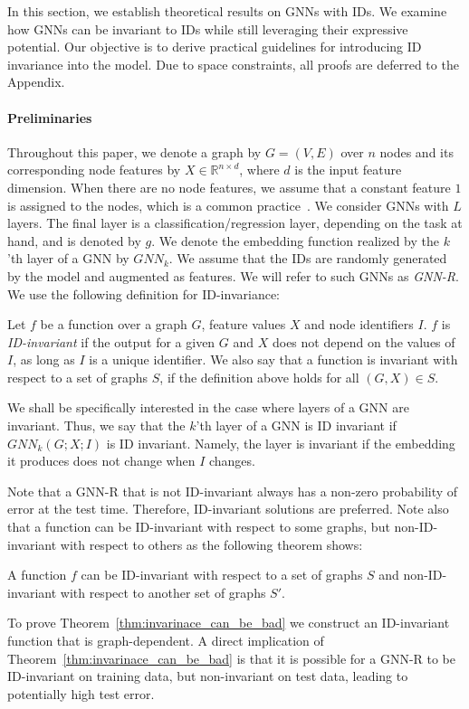 

In this section, we establish theoretical results on GNNs with IDs. We examine how  GNNs can be invariant to IDs while still leveraging their expressive potential.
Our objective is to derive practical guidelines for introducing ID invariance into the model. Due to space constraints, all proofs are deferred to the Appendix.

\paragraph{Preliminaries} Throughout this paper, we denote a graph by $G = (V, E)$ over $n$ nodes and its corresponding node features by ${X} \in \mathbb{R}^{n\times d}$, where \( d \) is the input feature dimension.
When there are no node features, we assume that a constant feature $1$ is assigned to the nodes, which is a common practice~\citep{gin, morris2021weisfeiler}.
We consider GNNs with \( L \) layers. The final layer is a classification/regression layer, depending on the task at hand, and is denoted by $g$.
We denote the embedding function realized by the $k$'th layer of a GNN by $GNN_k$.
We assume that the IDs are randomly generated by the model and augmented as features. We will refer to such GNNs as \textit{GNN-R}.
We use the following definition for ID-invariance:
\begin{definition}
    Let $f$ be a function over a graph $G$, feature values $X$ and node identifiers $I$.  $f$ is \textit{ID-invariant} if  the output for a given $G$ and $X$ does not depend on the values of $I$, as long as $I$ is a unique identifier. We also say that a function is invariant with respect to a set of graphs $S$, if the definition above holds for all $(G,X)\in S$.
\end{definition}


We shall be specifically interested in the case where layers of a GNN are invariant. Thus, we say that the $k$'th layer of a GNN is ID invariant if $GNN_k(G;X;I)$ is ID invariant. Namely, the layer is invariant if the embedding it produces does not change when $I$ changes. 

Note that a GNN-R that is not ID-invariant always has a non-zero probability of error at the test time.
Therefore, ID-invariant solutions are preferred. Note also that a function can be ID-invariant with respect to some graphs, but non-ID-invariant with respect to others as the following theorem shows:
\begin{theorem}\label{thm:invarinace_can_be_bad}
    A function $f$ can be ID-invariant with respect to a set of graphs $S$ and non-ID-invariant with respect to another set of graphs $S'$.
\end{theorem}
To prove Theorem~\ref{thm:invarinace_can_be_bad} we construct an ID-invariant function that is graph-dependent. 
A direct implication of Theorem~\ref{thm:invarinace_can_be_bad} is that it is possible for a GNN-R to be ID-invariant on training data, but non-invariant on test data, leading to potentially high test error.


